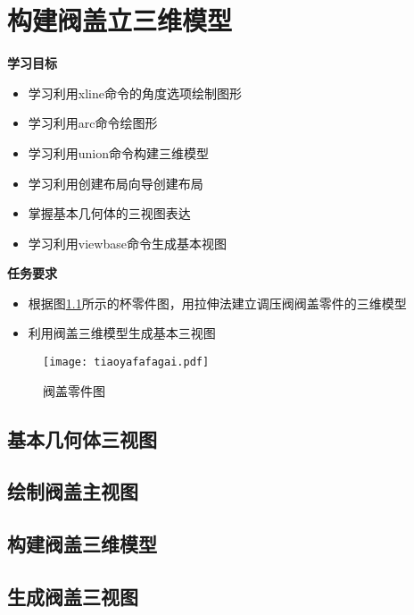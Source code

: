 \chapter{构建阀盖立三维模型}

{\bfseries 学习目标}
\begin{itemize}
\item 学习利用xline命令的角度选项绘制图形
\item 学习利用arc命令绘图形
\item 学习利用union命令构建三维模型
\item 学习利用创建布局向导创建布局
\item 掌握基本几何体的三视图表达
\item 学习利用viewbase命令生成基本视图
\end{itemize}

{\bfseries 任务要求}
\begin{itemize}
\item 根据图\ref{fig:tiaoyafafagai}所示的杯零件图，用拉伸法建立调压阀阀盖零件的三维模型
\item 利用阀盖三维模型生成基本三视图
\end{itemize}

\noindent
\begin{figure}[htbp]
\centering
\texttt{[image: tiaoyafafagai.pdf]}
\caption{阀盖零件图}\label{fig:tiaoyafafagai}
\end{figure}
\clearpage
\section{基本几何体三视图}


\section{绘制阀盖主视图}

\section{构建阀盖三维模型}

\section{生成阀盖三视图}

\endinput